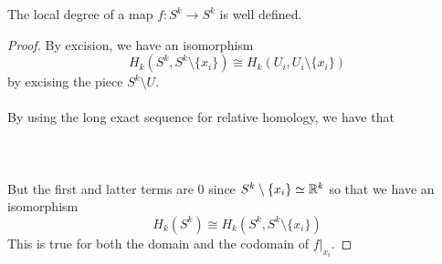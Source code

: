 \documentclass[a4paper]{article}
\begin{document}
\begin{lmm}{}{} The local degree of a map $f:S^k\to S^k$ is well defined. \tcbline
\begin{proof}
By excision, we have an isomorphism $$H_k(S^k,S^k\setminus\{x_i\})\cong H_k(U_i,U_i\setminus\{x_i\})$$ by excising the piece $S^k\setminus U$. \\~\\

By using the long exact sequence for relative homology, we have that \\~\\
\\~\\
But the first and latter terms are $0$ since $S^k\setminus\{x_i\}\simeq\mathbb{R}^k$ so that we have an isomorphism $$H_k(S^k)\cong H_k(S^k,S^k\setminus\{x_i\})$$ This is true for both the domain and the codomain of $f|_{x_i}$. 
\end{proof}
\end{lmm}
\end{document}
